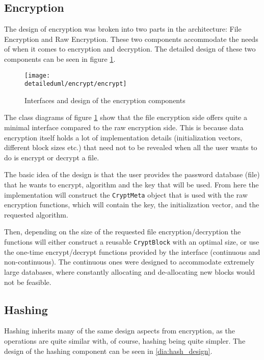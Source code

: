 \subsection{Encryption}

The design of encryption was broken into two parts in the architecture:
File Encryption and Raw Encryption. These two components accommodate the needs
of \pman when it comes to encryption and decryption. The detailed design of
these two components can be seen in figure \ref{dia:encrypt_design}.

\begin{figure}[H]
    \centering
    \centerline{\texttt{[image: \\detaileduml/encrypt/encrypt]}}
    \caption{Interfaces and design of the encryption components}
    \label{dia:encrypt_design}
\end{figure}

The class diagrams of figure \ref{dia:encrypt_design} show that the file
encryption side offers quite a minimal interface compared to the raw encryption
side. This is because data encryption itself holds a lot of implementation
details (initialization vectors, different block sizes etc.) that need not to
be revealed when all the user wants to do is encrypt or decrypt a file.

The basic idea of the design is that the user provides the password database
(file) that he wants to encrypt, algorithm and the key that will be used. From
here the implementation will construct the \texttt{CryptMeta} object that is
used with the raw encryption functions, which will contain the key, the
initialization vector, and the requested algorithm.

Then, depending on the size of the requested file encryption/decryption
the functions will either construct a reusable \texttt{CryptBlock} with an
optimal size, or use the one-time encrypt/decrypt functions provided by the
interface (continuous and non-continuous). The continuous ones were designed
to accommodate extremely large databases, where constantly allocating and
de-allocating new blocks would not be feasible.

\subsection{Hashing}

Hashing inherits many of the same design aspects from encryption, as the
operations are quite similar with, of course, hashing being quite simpler.
The design of the hashing component can be seen in \ref{dia:hash_design}.

